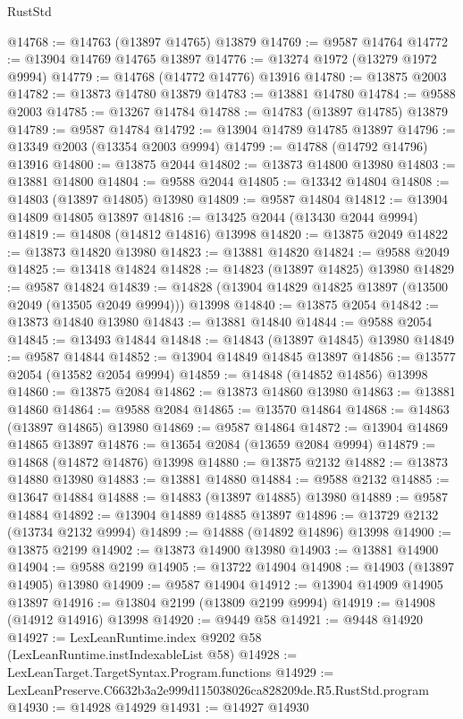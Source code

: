 \begin{lexlean}{RustStd}
\begin{coremodule}
@14768 := @14763 (@13897 @14765) @13879
@14769 := @9587 @14764
@14772 := @13904 @14769 @14765 @13897
@14776 := @13274 @1972 (@13279 @1972 @9994)
@14779 := @14768 (@14772 @14776) @13916
@14780 := @13875 @2003
@14782 := @13873 @14780 @13879
@14783 := @13881 @14780
@14784 := @9588 @2003
@14785 := @13267 @14784
@14788 := @14783 (@13897 @14785) @13879
@14789 := @9587 @14784
@14792 := @13904 @14789 @14785 @13897
@14796 := @13349 @2003 (@13354 @2003 @9994)
@14799 := @14788 (@14792 @14796) @13916
@14800 := @13875 @2044
@14802 := @13873 @14800 @13980
@14803 := @13881 @14800
@14804 := @9588 @2044
@14805 := @13342 @14804
@14808 := @14803 (@13897 @14805) @13980
@14809 := @9587 @14804
@14812 := @13904 @14809 @14805 @13897
@14816 := @13425 @2044 (@13430 @2044 @9994)
@14819 := @14808 (@14812 @14816) @13998
@14820 := @13875 @2049
@14822 := @13873 @14820 @13980
@14823 := @13881 @14820
@14824 := @9588 @2049
@14825 := @13418 @14824
@14828 := @14823 (@13897 @14825) @13980
@14829 := @9587 @14824
@14839 := @14828 (@13904 @14829 @14825 @13897 (@13500 @2049 (@13505 @2049 @9994))) @13998
@14840 := @13875 @2054
@14842 := @13873 @14840 @13980
@14843 := @13881 @14840
@14844 := @9588 @2054
@14845 := @13493 @14844
@14848 := @14843 (@13897 @14845) @13980
@14849 := @9587 @14844
@14852 := @13904 @14849 @14845 @13897
@14856 := @13577 @2054 (@13582 @2054 @9994)
@14859 := @14848 (@14852 @14856) @13998
@14860 := @13875 @2084
@14862 := @13873 @14860 @13980
@14863 := @13881 @14860
@14864 := @9588 @2084
@14865 := @13570 @14864
@14868 := @14863 (@13897 @14865) @13980
@14869 := @9587 @14864
@14872 := @13904 @14869 @14865 @13897
@14876 := @13654 @2084 (@13659 @2084 @9994)
@14879 := @14868 (@14872 @14876) @13998
@14880 := @13875 @2132
@14882 := @13873 @14880 @13980
@14883 := @13881 @14880
@14884 := @9588 @2132
@14885 := @13647 @14884
@14888 := @14883 (@13897 @14885) @13980
@14889 := @9587 @14884
@14892 := @13904 @14889 @14885 @13897
@14896 := @13729 @2132 (@13734 @2132 @9994)
@14899 := @14888 (@14892 @14896) @13998
@14900 := @13875 @2199
@14902 := @13873 @14900 @13980
@14903 := @13881 @14900
@14904 := @9588 @2199
@14905 := @13722 @14904
@14908 := @14903 (@13897 @14905) @13980
@14909 := @9587 @14904
@14912 := @13904 @14909 @14905 @13897
@14916 := @13804 @2199 (@13809 @2199 @9994)
@14919 := @14908 (@14912 @14916) @13998
@14920 := @9449 @58
@14921 := @9448 @14920
@14927 := LexLeanRuntime.index @9202 @58 (LexLeanRuntime.instIndexableList @58)
@14928 := LexLeanTarget.TargetSyntax.Program.functions
@14929 := LexLeanPreserve.C6632b3a2e999d115038026ca828209de.R5.RustStd.program
@14930 := @14928 @14929
@14931 := @14927 @14930

\end{coremodule}
\end{lexlean}
